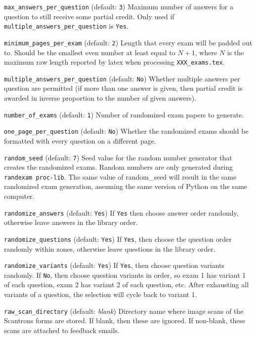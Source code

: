 \documentclass{article}
\begin{document}
\hangindent=1cm \texttt{max_answers_per_question} (default:
\texttt{3}) Maximum number of answers for a question to still receive
some partial credit. Only used if
\texttt{multiple_answers_per_question} is \texttt{Yes}.

\hangindent=1cm \texttt{minimum_pages_per_exam} (default: \texttt{2})
Length that every exam will be padded out to. Should be the smallest
even number at least equal to $N + 1$, where $N$ is the maximum raw
length reported by latex when processing \texttt{XXX_exams.tex}.

\hangindent=1cm \texttt{multiple_answers_per_question} (default:
\texttt{No}) Whether multiple answers per question are permitted (if
more than one answer is given, then partial credit is awarded in
inverse proportion to the number of given answers).

\hangindent=1cm \texttt{number_of_exams} (default: \texttt{1}) Number
of randomized exam papers to generate.

\hangindent=1cm \texttt{one_page_per_question} (default: \texttt{No})
Whether the randomized exams should be formatted with every question
on a different page.

\hangindent=1cm \texttt{random_seed} (default: \texttt{7}) Seed value
for the random number generator that creates the randomized
exams. Random numbers are only generated during \texttt{randexam
  proc-lib}. The same value of random_seed will result in the same
randomized exam generation, assuming the same version of Python on the
same computer.

\hangindent=1cm \texttt{randomize_answers} (default: \texttt{Yes}) If
\texttt{Yes} then choose answer order randomly, otherwise leave
answers in the library order.

\hangindent=1cm \texttt{randomize_questions} (default: \texttt{Yes})
If \texttt{Yes}, then choose the question order randomly within zones,
otherwise leave questions in the library order.

\hangindent=1cm \texttt{randomize_variants} (default: \texttt{Yes}) If
\texttt{Yes}, then choose question variants randomly. If \texttt{No},
then choose question variants in order, so exam 1 has variant 1 of
each question, exam 2 has variant 2 of each question, etc. After
exhausting all variants of a question, the selection will cycle back
to variant 1.

\hangindent=1cm \texttt{raw_scan_directory} (default: \emph{blank})
Directory name where image scans of the Scantrons forms are stored. If
blank, then these are ignored. If non-blank, these scans are attached
to feedback emails.
\end{document}
